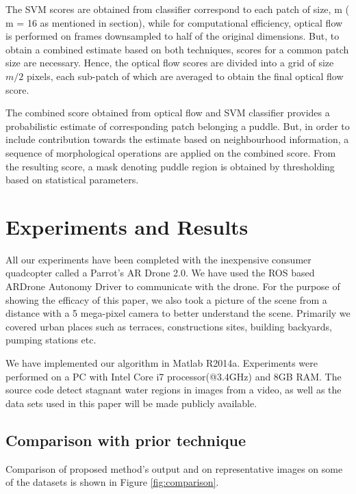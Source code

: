 \documentclass[times,10pt,twocolumn,letterpaper]{article}
\begin{document}
The SVM scores are obtained from classifier correspond to each patch of size, m
( m = 16 as mentioned in section), while for computational efficiency, optical
flow is performed on frames downsampled to half of the original dimensions.
But, to obtain a combined estimate based on both techniques, scores for a
common patch size are necessary. Hence, the optical flow scores are divided
into a grid of size $m/2$ pixels, each sub-patch of which are averaged to
obtain the final optical flow score.

The combined score obtained from optical flow and SVM classifier provides a
probabilistic estimate of corresponding patch belonging a puddle. But, in order
to include contribution towards the estimate based on neighbourhood
information, a sequence of morphological operations are applied on the
combined score. From the resulting score, a mask denoting puddle region is
obtained by thresholding based on statistical parameters.

\section{Experiments and Results}
All our experiments have been completed with the inexpensive consumer
quadcopter called a Parrot's AR Drone 2.0. We have used the ROS based
ARDrone Autonomy Driver to communicate with the drone. For the purpose
of showing the efficacy of this paper, we also took a picture of the
scene from a distance with a 5 mega-pixel camera to better understand
the scene. Primarily we covered urban places such as terraces, constructions
sites, building backyards, pumping stations etc.

We have implemented our algorithm in Matlab R2014a. Experiments were performed
on a PC with Intel Core i7 processor(@3.4GHz) and 8GB RAM.  The source code
detect stagnant water regions in images from a video, as well as the data sets
used in this paper will be made publicly available.

\subsection{Comparison with prior technique}
Comparison of proposed method's output and \cite{rankin04} on representative
images on some of the datasets is shown in Figure \ref{fig:comparison}.
\end{document}

